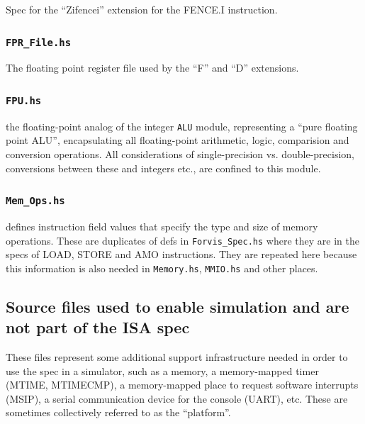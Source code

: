 \documentclass[11pt]{article}
\begin{document}
Spec for the ``Zifencei'' extension for the FENCE.I instruction.


\subsubsection{\tt FPR\_File.hs}

The floating point register file used by the ``F'' and ``D'' extensions.


\subsubsection{\tt FPU.hs}

 the floating-point analog of the integer \verb|ALU|
module, representing a ``pure floating point ALU'', encapsulating all
floating-point arithmetic, logic, comparision and conversion
operations. All considerations of single-precision
vs. double-precision, conversions between these and integers etc., are
confined to this module.


\subsubsection{\tt Mem\_Ops.hs} defines instruction field values that specify the
type and size of memory operations.  These are duplicates of defs in
\verb|Forvis_Spec.hs| where they are in the specs of LOAD, STORE and
AMO instructions.  They are repeated here because this information is
also needed in \verb|Memory.hs|, \verb|MMIO.hs| and other places.


\subsection{Source files used to enable simulation and are not part of the ISA spec}

These files represent some additional support infrastructure needed in
order to use the spec in a simulator, such as a memory, a
memory-mapped timer (MTIME, MTIMECMP), a memory-mapped place to
request software interrupts (MSIP), a serial communication device for
the console (UART), etc.  These are sometimes collectively referred to
as the ``platform''.

\end{document}
